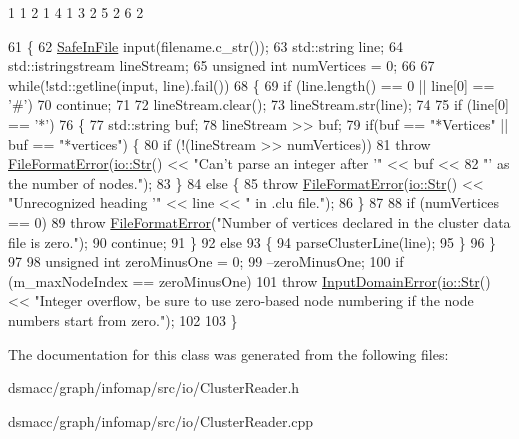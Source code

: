 1 1 2 1 4 1 3 2 5 2 6 2 
\begin{DoxyCode}
61 \{
62     \mbox{\hyperlink{classSafeInFile}{SafeInFile}} input(filename.c\_str());
63     std::string line;
64     std::istringstream lineStream;
65     \textcolor{keywordtype}{unsigned} \textcolor{keywordtype}{int} numVertices = 0;
66 
67     \textcolor{keywordflow}{while}(!std::getline(input, line).fail())
68     \{
69         \textcolor{keywordflow}{if} (line.length() == 0 || line[0] == \textcolor{charliteral}{'#'})
70             \textcolor{keywordflow}{continue};
71 
72         lineStream.clear();
73         lineStream.str(line);
74 
75         \textcolor{keywordflow}{if} (line[0] == \textcolor{charliteral}{'*'})
76         \{
77             std::string buf;
78             lineStream >> buf;
79             \textcolor{keywordflow}{if}(buf == \textcolor{stringliteral}{"*Vertices"} || buf == \textcolor{stringliteral}{"*vertices"}) \{
80                 \textcolor{keywordflow}{if} (!(lineStream >> numVertices))
81                     \textcolor{keywordflow}{throw} \mbox{\hyperlink{classFileFormatError}{FileFormatError}}(\mbox{\hyperlink{classio_1_1Str}{io::Str}}() << \textcolor{stringliteral}{"Can't parse an integer after
       '"} << buf <<
82                             \textcolor{stringliteral}{"' as the number of nodes."});
83             \}
84             \textcolor{keywordflow}{else} \{
85                 \textcolor{keywordflow}{throw} \mbox{\hyperlink{classFileFormatError}{FileFormatError}}(\mbox{\hyperlink{classio_1_1Str}{io::Str}}() << \textcolor{stringliteral}{"Unrecognized heading '"} << line 
      << \textcolor{stringliteral}{" in .clu file."});
86             \}
87 
88             \textcolor{keywordflow}{if} (numVertices == 0)
89                 \textcolor{keywordflow}{throw} \mbox{\hyperlink{classFileFormatError}{FileFormatError}}(\textcolor{stringliteral}{"Number of vertices declared in the cluster data file
       is zero."});
90             \textcolor{keywordflow}{continue};
91         \}
92         \textcolor{keywordflow}{else}
93         \{
94             parseClusterLine(line);
95         \}
96     \}
97 
98     \textcolor{keywordtype}{unsigned} \textcolor{keywordtype}{int} zeroMinusOne = 0;
99     --zeroMinusOne;
100     \textcolor{keywordflow}{if} (m\_maxNodeIndex == zeroMinusOne)
101         \textcolor{keywordflow}{throw} \mbox{\hyperlink{classInputDomainError}{InputDomainError}}(\mbox{\hyperlink{classio_1_1Str}{io::Str}}() << \textcolor{stringliteral}{"Integer overflow, be sure to use
       zero-based node numbering if the node numbers start from zero."});
102 
103 \}
\end{DoxyCode}


The documentation for this class was generated from the following files\+:\begin{DoxyCompactItemize}
\item 
dsmacc/graph/infomap/src/io/Cluster\+Reader.\+h\item 
dsmacc/graph/infomap/src/io/Cluster\+Reader.\+cpp\end{DoxyCompactItemize}
